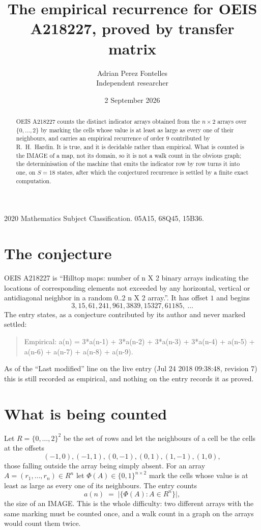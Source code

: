 \documentclass[11pt,a4paper]{article}
\title{The empirical recurrence for OEIS A218227, proved by transfer matrix}
\author{Adrian Perez Fontelles\\ \small Independent researcher}
\date{2 September 2026}
\theoremstyle{plain}
\theoremstyle{definition}
\begin{document}
\maketitle

\begin{abstract}
OEIS A218227 counts the distinct indicator arrays obtained from the $n\times2$ arrays over
$\{0,\dots,2\}$ by marking the cells whose value is at least as large as every one of their neighbours, and carries an
empirical recurrence of order $9$ contributed by R.~H.~Hardin. It is true, and it is
decidable rather than empirical. What is counted is the IMAGE of a map, not its domain, so it
is not a walk count in the obvious graph; the determinisation of the machine that emits the
indicator row by row turns it into one, on $S=18$ states, after which the conjectured
recurrence is settled by a finite exact computation.
\end{abstract}

\noindent\small 2020 Mathematics Subject Classification. 05A15, 68Q45, 15B36.\normalsize

\section{The conjecture}

OEIS A218227 is ``Hilltop maps: number of n X 2 binary arrays indicating the locations of corresponding elements not exceeded by any horizontal, vertical or antidiagonal neighbor in a random 0..2 n X 2 array.''. It has offset $1$ and begins
\[
3, 15, 61, 241, 961, 3839, 15327, 61185,\ \dots
\]
The entry states, as a conjecture contributed by its author and never marked settled:
\begin{quote}
Empirical: a(n) = 3*a(n-1) + 3*a(n-2) + 3*a(n-3) + 3*a(n-4) + a(n-5) + a(n-6) + a(n-7) + a(n-8) + a(n-9).
\end{quote}
As of the ``Last modified'' line on the live entry (Jul 24 2018 09:38:48, revision 7) this is still
recorded as empirical, and nothing on the entry records it as proved.

\section{What is being counted}

Let $R=\{0,\dots,2\}^{2}$ be the set of rows and let the neighbours of a cell be the
cells at the offsets
\[
(-1,0), (-1,1), (0,-1), (0,1), (1,-1), (1,0),
\]
those falling outside the array being simply absent. For an array
$A=(r_1,\dots,r_n)\in R^n$ let $\Phi(A)\in\{0,1\}^{n\times2}$ mark the cells whose value
is at least as large as every one of its neighbours. The entry counts
\[
a(n)\;=\;\bigl|\{\Phi(A):A\in R^n\}\bigr| ,
\]
the size of an IMAGE. This is the whole difficulty: two different arrays with the same marking
must be counted once, and a walk count in a graph on the arrays would count them twice.
\end{document}
